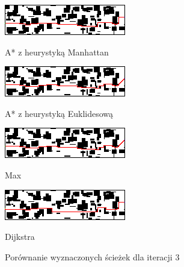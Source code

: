 \documentclass[12pt,twoside]{article}
\begin{document}
\begin{figure}[ht]
    \centering
    \begin{minipage}{0.4\textwidth}
        \centering
        \includegraphics[width=\linewidth]{figures/static_algo/map_astar_manhattan_3.png}
        \caption*{A* z heurystyką Manhattan}
        \label{fig:map_astar_manhattan_3}
    \end{minipage}
    \hspace{0.1\textwidth}
    \begin{minipage}{0.4\textwidth}
        \centering
        \includegraphics[width=\linewidth]{figures/static_algo/map_astar_euclidean_3.png}
        \caption*{A* z heurystyką Euklidesową}
        \label{fig:map_astar_euclidean_3}
    \end{minipage}
    \vspace{0.5cm}
    
	\begin{minipage}{0.4\textwidth}
        \centering
        \includegraphics[width=\linewidth]{figures/static_algo/map_astar_max_3.png}
        \caption*{Max}
        \label{fig:map_astar_max_3}
    \end{minipage}    
    \hspace{0.1\textwidth}
    \begin{minipage}{0.4\textwidth}
        \centering
        \includegraphics[width=\linewidth]{figures/static_algo/map_dijkstra_3.png}
        \caption*{Dijkstra}
        \label{fig:map_dijkstra_3}
    \end{minipage}
    \caption{Porównanie wyznaczonych ścieżek dla iteracji 3}
    \label{fig:comparison_iteration_3}
\end{figure}
\end{document}
